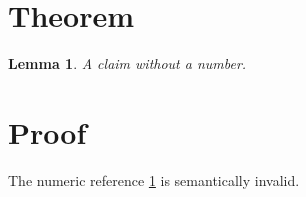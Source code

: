 \section{Theorem}
\newtheorem*{lemma*}{Lemma}
\begin{lemma*}\label{lem:starred}
A claim without a number.
\end{lemma*}
\section{Proof}
The numeric reference \ref{lem:starred} is semantically invalid.
